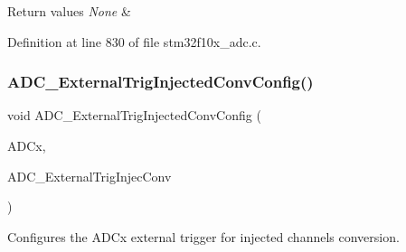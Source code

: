 \begin{DoxyRetVals}{Return values}
{\em None} & \\
\hline
\end{DoxyRetVals}


Definition at line 830 of file stm32f10x\+\_\+adc.\+c.

\mbox{\label{group___a_d_c___private___functions_gafc02ce1e84e96b692adf085f61a0bca6}} 
\subsubsection{\texorpdfstring{A\+D\+C\+\_\+\+External\+Trig\+Injected\+Conv\+Config()}{ADC\_ExternalTrigInjectedConvConfig()}}
{\footnotesize\ttfamily void A\+D\+C\+\_\+\+External\+Trig\+Injected\+Conv\+Config (\begin{DoxyParamCaption}\item[{\hyperlink{struct_a_d_c___type_def}{A\+D\+C\+\_\+\+Type\+Def} $\ast$}]{A\+D\+Cx,  }\item[{uint32\+\_\+t}]{A\+D\+C\+\_\+\+External\+Trig\+Injec\+Conv }\end{DoxyParamCaption})}



Configures the A\+D\+Cx external trigger for injected channels conversion. 


